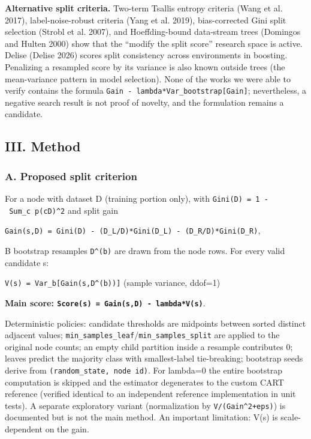 \documentclass[
  conference]{IEEEtran}
\begin{document}
\textbf{Alternative split criteria.} Two-term Tsallis entropy criteria
(Wang et al. 2017), label-noise-robust criteria (Yang et al. 2019),
bias-corrected Gini split selection (Strobl et al. 2007), and
Hoeffding-bound data-stream trees (Domingos and Hulten 2000) show that
the ``modify the split score'' research space is active. Delise (Delise
2026) scores split consistency across environments in boosting.
Penalizing a resampled score by its variance is also known outside trees
(the mean-variance pattern in model selection). None of the works we
were able to verify contains the formula
\texttt{Gain\ -\ lambda*Var\_bootstrap{[}Gain{]}}; nevertheless, a
negative search result is not proof of novelty, and the formulation
remains a candidate.

\subsection{III. Method}\label{iii.-method}

\subsubsection{A. Proposed split
criterion}\label{a.-proposed-split-criterion}

For a node with dataset D (training portion only), with
\texttt{Gini(D)\ =\ 1\ -\ Sum\_c\ p(c\textbar{}D)\^{}2} and split gain

\texttt{Gain(s,D)\ =\ Gini(D)\ -\ (\textbar{}D\_L\textbar{}/\textbar{}D\textbar{})*Gini(D\_L)\ -\ (\textbar{}D\_R\textbar{}/\textbar{}D\textbar{})*Gini(D\_R)},

B bootstrap resamples \texttt{D\^{}(b)} are drawn from the node rows.
For every valid candidate s:

\texttt{V(s)\ =\ Var\_b{[}Gain(s,D\^{}(b)){]}} (sample variance, ddof=1)

\textbf{Main score: \texttt{Score(s)\ =\ Gain(s,D)\ -\ lambda*V(s)}}.

Deterministic policies: candidate thresholds are midpoints between
sorted distinct adjacent values;
\texttt{min\_samples\_leaf}/\texttt{min\_samples\_split} are applied to
the original node counts; an empty child partition inside a resample
contributes 0; leaves predict the majority class with smallest-label
tie-breaking; bootstrap seeds derive from
\texttt{(random\_state,\ node\ id)}. For lambda=0 the entire bootstrap
computation is skipped and the estimator degenerates to the custom CART
reference (verified identical to an independent reference implementation
in unit tests). A separate exploratory variant (normalization by
\texttt{V/(Gain\^{}2+eps)}) is documented but is not the main method. An
important limitation: V(s) is scale-dependent on the gain.
\end{document}
